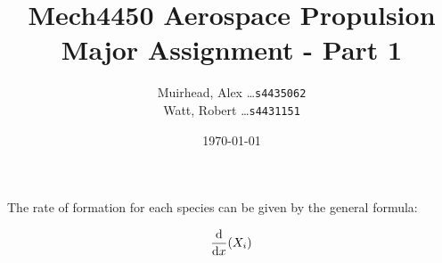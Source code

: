 \documentclass[a4paper]{article}
\title{
	\Large {\sc Mech}4450 Aerospace Propulsion \\
	\Huge Major Assignment - Part 1
}
\author{
	Muirhead, Alex \dots \texttt{s4435062} \\
	Watt, Robert \dots \texttt{s4431151}
}
\date{\today}
\begin{document}
\maketitle


\vspace{10em}

\newpage
{}

The rate of formation for each species can be given by the general formula:

\begin{equation}
	\label{eq:General rate}
	\frac{\mathrm{d}}{\mathrm{d}x} (X_i)
\end{equation}
\end{document}
